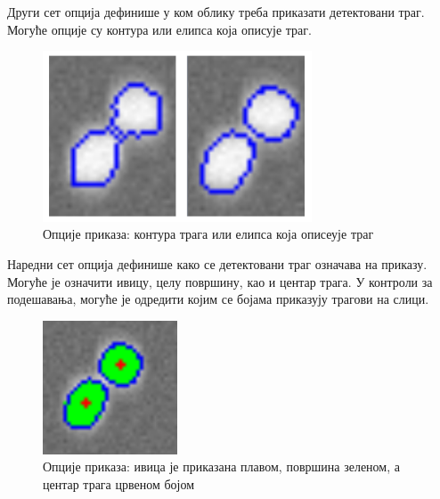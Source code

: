 \documentclass[12pt,a4paper,serbian,oneside]{book}
\begin{document}
Други сет опција дефинише у ком облику треба приказати детектовани траг. Могуће опције су контура или елипса која описује траг.

\begin{figure}[H]
\begin{center}
\includegraphics[width=80mm]{images/shapetype.png}
\end{center}
\caption{Опције приказа: контура трага или елипса која описеује траг}
\label{fig:shapetype}
\end{figure}

Наредни сет опција дефинише како се детектовани траг означава на приказу. Могуће је означити ивицу, целу површину, као и центар трага.
У контроли за подешавања, могуће је одредити којим се бојама приказују трагови на слици.

\begin{figure}[H]
\begin{center}
\includegraphics[width=40mm]{images/trace.png}
\end{center}
\caption{Опције приказа: ивица је приказана плавом, површина зеленом, а центар трага црвеном бојом}
\label{fig:trace}
\end{figure}
\end{document}
